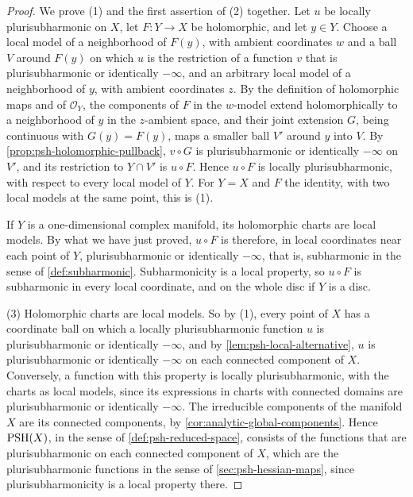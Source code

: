 \begin{proof}
We prove (1) and the first assertion of (2) together. Let $u$ be locally plurisubharmonic on $X$, let $F\colon Y\to X$ be holomorphic, and let $y\in Y$. Choose a local model of a neighborhood of $F(y)$, with ambient coordinates $w$ and a ball $V$ around $F(y)$ on which $u$ is the restriction of a function $v$ that is plurisubharmonic or identically $-\infty$, and an arbitrary local model of a neighborhood of $y$, with ambient coordinates $z$. By the definition of holomorphic maps and of $\mathcal O_Y$, the components of $F$ in the $w$-model extend holomorphically to a neighborhood of $y$ in the $z$-ambient space, and their joint extension $G$, being continuous with $G(y)=F(y)$, maps a smaller ball $V'$ around $y$ into $V$. By \cref{prop:psh-holomorphic-pullback}, $v\circ G$ is plurisubharmonic or identically $-\infty$ on $V'$, and its restriction to $Y\cap V'$ is $u\circ F$. Hence $u\circ F$ is locally plurisubharmonic, with respect to every local model of $Y$. For $Y=X$ and $F$ the identity, with two local models at the same point, this is (1).

If $Y$ is a one-dimensional complex manifold, its holomorphic charts are local models. By what we have just proved, $u\circ F$ is therefore, in local coordinates near each point of $Y$, plurisubharmonic or identically $-\infty$, that is, subharmonic in the sense of \cref{def:subharmonic}. Subharmonicity is a local property, so $u\circ F$ is subharmonic in every local coordinate, and on the whole disc if $Y$ is a disc.

(3) Holomorphic charts are local models. So by (1), every point of $X$ has a coordinate ball on which a locally plurisubharmonic function $u$ is plurisubharmonic or identically $-\infty$, and by \cref{lem:psh-local-alternative}, $u$ is plurisubharmonic or identically $-\infty$ on each connected component of $X$. Conversely, a function with this property is locally plurisubharmonic, with the charts as local models, since its expressions in charts with connected domains are plurisubharmonic or identically $-\infty$. The irreducible components of the manifold $X$ are its connected components, by \cref{cor:analytic-global-components}. Hence $\mathrm{PSH}(X)$, in the sense of \cref{def:psh-reduced-space}, consists of the functions that are plurisubharmonic on each connected component of $X$, which are the plurisubharmonic functions in the sense of \cref{sec:psh-hessian-maps}, since plurisubharmonicity is a local property there.
\end{proof}


